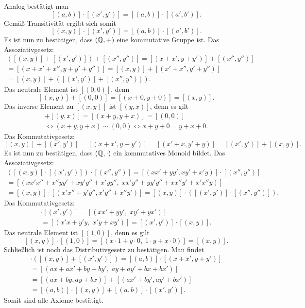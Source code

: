 \begin{Beweis}
Analog bestätigt man
\[[(a,b)]\cdot [(x',y')] = [(a,b)]\cdot [(a',b')].\]
Gemäß Transitivität ergibt sich somit
\[[(x,y)]\cdot [(x',y')] = [(a,b)]\cdot [(a',b')].\]
Es ist nun zu bestätigen, dass $(\mathbb Q,+)$ eine kommutative Gruppe ist.
Das Assoziativgesetz:
\begin{gather*}
([(x,y)]+[(x',y')])+[(x'',y'')]
= [(x+x',y+y')] + [(x'',y'')]\\
= [(x+x'+x'',y+y'+y'')]
= [(x,y)]+[(x'+x'',y'+y'')]\\
= [(x,y)]+([(x',y')]+[(x'',y'')]).
\end{gather*}
Das neutrale Element ist $[(0,0)]$, denn
\[[(x,y)]+[(0,0)] = [(x+0,y+0)] = [(x,y)].\]
Das inverse Element zu $[(x,y)]$ ist $[(y,x)]$, denn es gilt
\begin{gather*}
[(x,y)]+[(y,x)] = [(x+y,y+x)] = [(0,0)]\\
\iff (x+y,y+x)\sim (0,0)\iff x+y+0 = y+x+0.
\end{gather*}
Das Kommutativgesetz:
\[[(x,y)]+[(x',y')] = [(x+x',y+y')]
= [(x'+x,y'+y)]
= [(x',y')]+[(x,y)].\]
Es ist nun zu bestätigen, dass $(\mathbb Q,\cdot)$ ein kommutatives
Monoid bildet. Das Assoziativgesetz:
\begin{gather*}
([(x,y)]\cdot [(x',y')])\cdot [(x'',y'')]
= [(xx'+yy',xy'+x'y)]\cdot [(x'',y'')]\\
= [(xx'x''+x''yy'+xy'y''+x'yy'',\;
xx'y''+yy'y''+xx''y'+x'x''y)]\\
= [(x,y)]\cdot [(x'x''+y'y'',x'y''+x''y')]
= [(x,y)]\cdot ([(x',y')]\cdot [(x'',y'')]).
\end{gather*}
Das Kommutativgesetz:
\begin{gather*}
[(x,y)]\cdot [(x',y')] = [(xx'+yy',\;xy'+yx')]\\
= [(x'x+y'y,\;x'y+xy')] = [(x',y')]\cdot [(x,y)].
\end{gather*}
Das neutrale Element ist $[(1,0)]$, denn es gilt
\[[(x,y)]\cdot [(1,0)] = [(x\cdot 1+y\cdot 0,\;1\cdot y+x\cdot 0)]
= [(x,y)].\]
Schließlich ist noch das Distributivgesetz zu bestätigen.
Man findet
\begin{gather*}
[(a,b)]\cdot ([(x,y)]+[(x',y')])
= [(a,b)]\cdot [(x+x',y+y')]\\
= [(ax+ax'+by+by',\;ay+ay'+bx+bx')]\\
= [(ax+by,ay+bx)]+[(ax'+by',ay'+bx')]\\
= [(a,b)]\cdot [(x,y)] + [(a,b)]\cdot [(x',y')].
\end{gather*}
Somit sind alle Axiome bestätigt.\,\qedsymbol
\end{Beweis}

